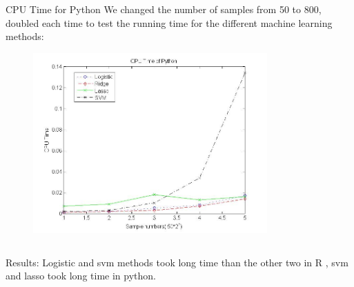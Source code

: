\documentclass{beamer}
\begin{document}
\begin{frame}
\begin{columns}
\column{2.3in}
\begin{block}{CPU Time for Python}
We changed the number of samples from 50 to 800, doubled each time to test the running time for the different machine learning methods:\\
\begin{figure}
     \includegraphics[width=0.8\textwidth, height=0.5\textheight]{cputime_python.jpg}

    \end{figure}
\end{block}

\end{columns}

\begin{block}{Results:}
Logistic and svm methods took long time than the other two in R , svm and lasso took long time in python.\\

\end{block}


\end{frame}
\end{document}
